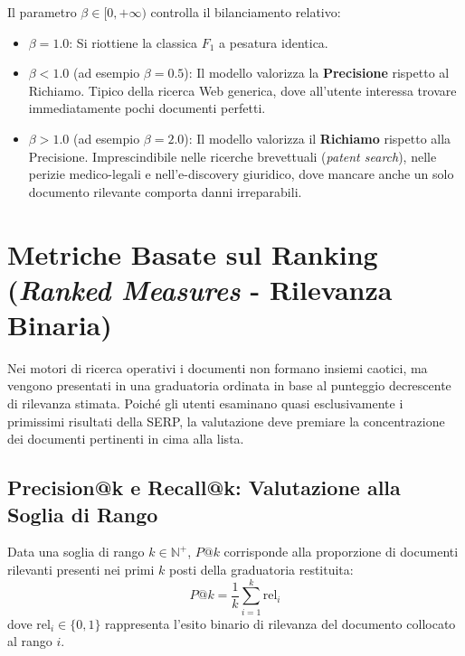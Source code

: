 Il parametro $\beta \in [0, +\infty)$ controlla il bilanciamento relativo:
\begin{itemize}
    \item $\beta = 1.0$: Si riottiene la classica $F_1$ a pesatura identica.
    \item $\beta < 1.0$ (ad esempio $\beta = 0.5$): Il modello valorizza la \textbf{Precisione} rispetto al Richiamo. Tipico della ricerca Web generica, dove all'utente interessa trovare immediatamente pochi documenti perfetti.
    \item $\beta > 1.0$ (ad esempio $\beta = 2.0$): Il modello valorizza il \textbf{Richiamo} rispetto alla Precisione. Imprescindibile nelle ricerche brevettuali (\textit{patent search}), nelle perizie medico-legali e nell'e-discovery giuridico, dove mancare anche un solo documento rilevante comporta danni irreparabili.
\end{itemize}

\FloatBarrier
\section{Metriche Basate sul Ranking (\textit{Ranked Measures} - Rilevanza Binaria)}
\label{sec:metriche-ranking-binarie}

Nei motori di ricerca operativi i documenti non formano insiemi caotici, ma vengono presentati in una graduatoria ordinata in base al punteggio decrescente di rilevanza stimata. Poiché gli utenti esaminano quasi esclusivamente i primissimi risultati della SERP, la valutazione deve premiare la concentrazione dei documenti pertinenti in cima alla lista.

\FloatBarrier
\subsection{Precision@k e Recall@k: Valutazione alla Soglia di Rango}
\label{subsec:precision-at-k}

\begin{definition}[Precision@k ($P@k$)]
Data una soglia di rango $k \in \mathbb{N}^+$, $P@k$ corrisponde alla proporzione di documenti rilevanti presenti nei primi $k$ posti della graduatoria restituita:
\begin{equation}
P@k = \frac{1}{k} \sum_{i=1}^k \mathrm{rel}_i
\end{equation}
dove $\mathrm{rel}_i \in \{0, 1\}$ rappresenta l'esito binario di rilevanza del documento collocato al rango $i$.
\end{definition}

